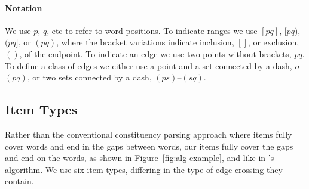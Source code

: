 \paragraph{Notation}
We use $p$, $q$, etc to refer to word positions.
To indicate ranges we use $[pq]$, $[pq)$, $(pq]$, or $(pq)$, where the bracket variations indicate inclusion, $[]$, or exclusion, $()$, of the endpoint.
To indicate an edge we use two points without brackets, \myeg $pq$.
To define a class of edges we either use a point and a set connected by a dash, \myeg $o$--$(pq)$, or two sets connected by a dash, \myeg $(ps)$--$(sq)$.

\subsection{Item Types}

Rather than the conventional constituency parsing approach where items fully cover words and end in the gaps between words, our items fully cover the gaps and end on the words, as shown in Figure~\ref{fig:alg-example}, and like in \textcite{eisner-satta-1999}'s algorithm.
We use six item types, differing in the type of edge crossing they contain.  \\

